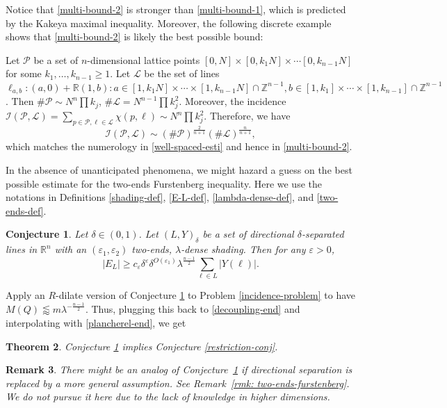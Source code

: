 \documentclass{amsart}
\numberwithin{equation}{section}
\newtheorem{theorem}{Theorem}[section]
\newtheorem{remark}[theorem]{Remark}
\newtheorem{conjecture}[theorem]{Conjecture}
\newcommand{\de}{\delta}
\newcommand{\e}{\varepsilon}
\newcommand{\la}{\lambda}
\newcommand{\cp}{\mathcal P}
\newcommand{\ci}{\mathcal I}
\newcommand{\ZR}{\mathbb{R}}
\newcommand{\ZZ}{\mathbb{Z}}
\newcommand{\cl}{{\mathcal L}}
\begin{document}
\smallskip

Notice that \eqref{multi-bound-2} is stronger than \eqref{multi-bound-1}, which is predicted by the Kakeya maximal inequality. 
Moreover, the following discrete example shows that \eqref{multi-bound-2} is likely the best possible bound: 

Let $\cp$ be a set of $n$-dimensional lattice points $[0,N]\times[0,k_1N]\times\cdots [0,k_{n-1}N]$ for some $k_1,\ldots, k_{n-1}\geq1$. Let $\cl$ be the set of lines $\ell_{a,b}:(a,0)+\ZR (1,b):a\in[1,k_1N]\times\cdots\times[1,k_{n-1}N]\cap\ZZ^{n-1}, b\in[1,k_1]\times\cdots\times[1,k_{n-1}]\cap\ZZ^{n-1}$. 
Then $\#\cp\sim N^n\prod k_j$, $\#\cl=N^{n-1}\prod k_j^2$. Moreover, the incidence $\ci(\cp,\cl)=\sum_{p\in\cp,\ell\in\cl}\chi(p,\ell)
\sim N^n\prod k_j^2$. 
Therefore, we have
\begin{equation}
    \ci(\cp,\cl)\sim (\#\cp)^\frac{2}{n+1}(\#\cl)^\frac{n}{n+1},
\end{equation}
which matches the numerology in \eqref{well-spaced-esti} and hence in \eqref{multi-bound-2}.

\smallskip

In the absence of unanticipated phenomena, we might hazard a guess on the best possible estimate for the two-ends Furstenberg inequality. 
Here we use the notations in Definitions \ref{shading-def}, \ref{E-L-def}, \ref{lambda-dense-def}, and \ref{two-ends-def}.
\begin{conjecture}
\label{two-ends-kakeya-conj}
Let $\de\in(0,1)$.
Let $(L,Y)_\de$ be a set of directional $\de$-separated lines in $\ZR^n$ with an $(\e_1,\e_2)$ two-ends, $\lambda$-dense shading. 
Then for any $\e>0$,
\begin{equation}
    |E_L|\geq c_\e\de^{\e}\de^{O(\e_1)} \la^{\frac{n-1}{2}}\sum_{\ell\in L}|Y(\ell)|.
\end{equation}
\end{conjecture}

Apply an $R$-dilate version of Conjecture \ref{two-ends-kakeya-conj} to  Problem \ref{incidence-problem} to have $M(Q)\lessapprox m\la^{-\frac{n-1}{2}}$. 
Thus, plugging this back to \eqref{decoupling-end} and interpolating with \eqref{plancherel-end}, we get
\begin{theorem}
\label{proof-of-restriction}
Conjecture \ref{two-ends-kakeya-conj} implies Conjecture \ref{restriction-conj}.
\end{theorem}

\begin{remark}
\rm

There might be an analog of Conjecture~\ref{two-ends-kakeya-conj} if directional separation is replaced by a more general assumption. 
See Remark~\ref{rmk: two-ends-furstenberg}. 
We do not pursue it here due to the lack of knowledge in higher dimensions. 
\end{remark}
\end{document}
